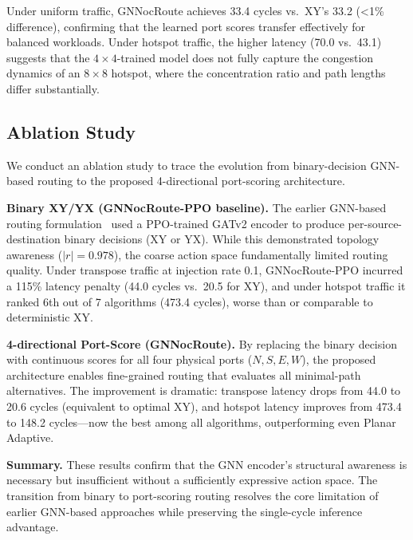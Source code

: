 Under uniform traffic, GNNocRoute achieves 33.4 cycles vs.~XY's 33.2 (\textless1\% difference), confirming that the learned port scores transfer effectively for balanced workloads. Under hotspot traffic, the higher latency (70.0 vs.~43.1) suggests that the $4\times4$-trained model does not fully capture the congestion dynamics of an $8\times8$ hotspot, where the concentration ratio and path lengths differ substantially.

\subsection{Ablation Study}

We conduct an ablation study to trace the evolution from binary-decision GNN-based routing to the proposed 4-directional port-scoring architecture.

\textbf{Binary XY/YX (GNNocRoute-PPO baseline).} The earlier GNN-based routing formulation~\cite{periodic2025} used a PPO-trained GATv2 encoder to produce per-source-destination binary decisions (XY or YX). While this demonstrated topology awareness ($|r|=0.978$), the coarse action space fundamentally limited routing quality. Under transpose traffic at injection rate 0.1, GNNocRoute-PPO incurred a 115\% latency penalty (44.0 cycles vs.~20.5 for XY), and under hotspot traffic it ranked 6th out of 7 algorithms (473.4 cycles), worse than or comparable to deterministic XY.

\textbf{4-directional Port-Score (GNNocRoute).} By replacing the binary decision with continuous scores for all four physical ports ($N,S,E,W$), the proposed architecture enables fine-grained routing that evaluates all minimal-path alternatives. The improvement is dramatic: transpose latency drops from 44.0 to 20.6 cycles (equivalent to optimal XY), and hotspot latency improves from 473.4 to 148.2 cycles---now the best among all algorithms, outperforming even Planar Adaptive.

\textbf{Summary.} These results confirm that the GNN encoder's structural awareness is necessary but insufficient without a sufficiently expressive action space. The transition from binary to port-scoring routing resolves the core limitation of earlier GNN-based approaches while preserving the single-cycle inference advantage.

